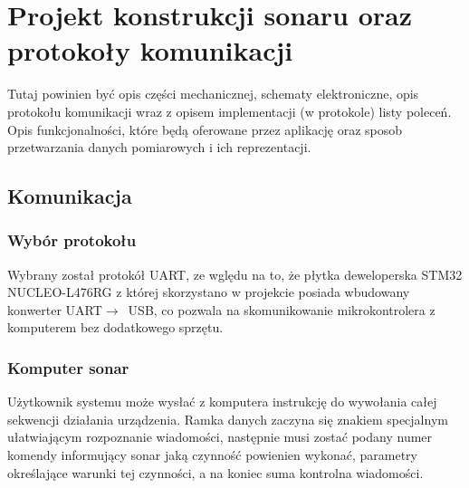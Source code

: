 \chapter[Projekt konstrukcji sonaru oraz protokoły komunikacji]{Projekt konstrukcji sonaru oraz protokoły komunikacji}

\label{konstrukcja}

Tutaj powinien być opis części mechanicznej, schematy elektroniczne,
opis protokołu komunikacji wraz z opisem implementacji (w protokole)
listy poleceń.
Opis funkcjonalności, które będą oferowane przez aplikację
oraz sposob przetwarzania danych pomiarowych i ich reprezentacji.

\section{Komunikacja}

\subsection{Wybór protokołu}

Wybrany został protokół UART, ze wględu na to, że płytka deweloperska STM32 NUCLEO-L476RG 
z której skorzystano w projekcie posiada wbudowany konwerter UART$\rightarrow$~USB, 
co pozwala na skomunikowanie mikrokontrolera z komputerem bez dodatkowego sprzętu.

\subsection{Komputer \textrightarrow{} sonar}
Użytkownik systemu może wysłać z komputera instrukcję do wywołania całej sekwencji działania urządzenia. 
Ramka danych zaczyna się znakiem specjalnym ułatwiającym rozpoznanie wiadomości, 
następnie musi zostać podany numer komendy informujący sonar jaką czynność powienien wykonać, 
parametry określające warunki tej czynności, a na koniec suma kontrolna wiadomości.

